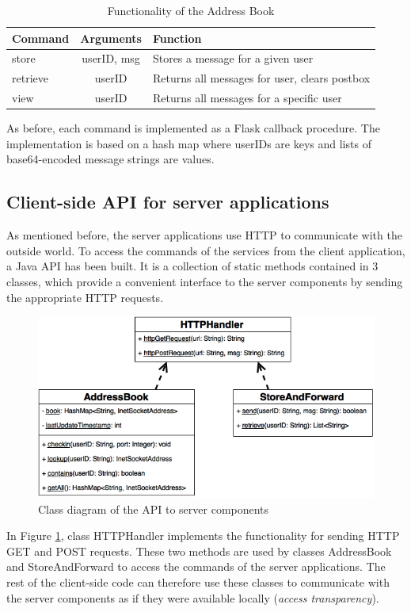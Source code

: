 \documentclass[a4paper, 12pt]{report}
\begin{document}
\begin{table}[H]
\centering
\begin{tabular*}{0.9\textwidth}{l | c | l}
    Command & Arguments & Function \\
    \hline
    store & userID, msg & Stores a message for a given user \\
    retrieve & userID & Returns all messages for user, clears postbox\\
    view & userID & Returns all messages for a specific user \\
\end{tabular*}
\caption{\label{tab:saf} Functionality of the Address Book}
\end{table}

As before, each command is implemented as a Flask callback procedure. The implementation is based on a hash map where userIDs are keys and lists of base64-encoded message strings are values.


\subsection{Client-side API for server applications}
\label{subsec:impl.prep.API}
As mentioned before, the server applications use HTTP to communicate with the outside world. To access the commands of the services from the client application, a Java API has been built. It is a collection of static methods contained in 3 classes, which provide a convenient interface to the server components by sending the appropriate HTTP requests.

\begin{figure}[H]
    \centering
    \includegraphics[width = 0.8 \linewidth]{pics/scaffolding_uml.png}
    \caption{\label{fig:scaffolding_uml} Class diagram of the API to server components}
\end{figure}
In Figure \ref{fig:scaffolding_uml}, class HTTPHandler implements the functionality for sending HTTP GET and POST requests. These two methods are used by classes AddressBook and StoreAndForward to access the commands of the server applications. The rest of the client-side code can therefore use these classes to communicate with the server components as if they were available locally (\emph{access transparency}). \\
\end{document}
